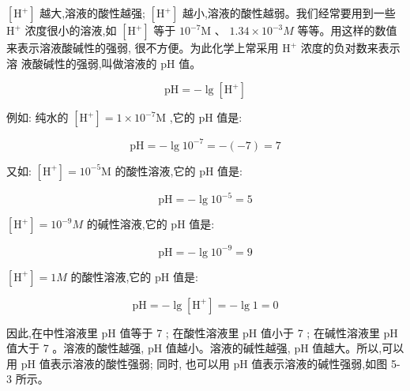 \documentclass[10pt]{article}
\begin{document}
\(\left\lbrack {\mathrm{H}}^{ + }\right\rbrack\) 越大,溶液的酸性越强; \(\left\lbrack {\mathrm{H}}^{ + }\right\rbrack\) 越小,溶液的酸性越弱。我们经常要用到一些 \({\mathrm{H}}^{ + }\) 浓度很小的溶液,如 \(\left\lbrack {\mathrm{H}}^{ + }\right\rbrack\) 等于 \({10}^{-7}\mathrm{M}\) 、 \({1.34} \times {10}^{-3}M\) 等等。用这样的数值来表示溶液酸碱性的强弱, 很不方便。为此化学上常采用 \({\mathrm{H}}^{ + }\) 浓度的负对数来表示溶 液酸碱性的强弱,叫做溶液的 \(\mathrm{{pH}}\) 值。

\[
\mathrm{{pH}} = - \lg \left\lbrack {\mathrm{H}}^{ + }\right\rbrack
\]

例如: 纯水的 \(\left\lbrack {\mathrm{H}}^{ + }\right\rbrack = 1 \times {10}^{-7}\mathrm{M}\) ,它的 \(\mathrm{{pH}}\) 值是:

\[
\mathrm{{pH}} = - \lg {10}^{-7} = - \left( {-7}\right) = 7
\]

又如: \(\left\lbrack {\mathrm{H}}^{ + }\right\rbrack = {10}^{-5}\mathrm{M}\) 的酸性溶液,它的 \(\mathrm{{pH}}\) 值是:

\[
\mathrm{{pH}} = - \lg {10}^{-5} = 5
\]

\(\left\lbrack {\mathrm{H}}^{ + }\right\rbrack = {10}^{-9}M\) 的碱性溶液,它的 \(\mathrm{{pH}}\) 值是:

\[
\mathrm{{pH}} = - \lg {10}^{-9} = 9
\]

\(\left\lbrack {\mathrm{H}}^{ + }\right\rbrack = {1M}\) 的酸性溶液,它的 \(\mathrm{{pH}}\) 值是:

\[
\mathrm{{pH}} = - \lg \left\lbrack {\mathrm{H}}^{ + }\right\rbrack = - \lg 1 = 0
\]

因此,在中性溶液里 \(\mathrm{{pH}}\) 值等于 7 ; 在酸性溶液里 \(\mathrm{{pH}}\) 值小于 7 ; 在碱性溶液里 \(\mathrm{{pH}}\) 值大于 7 。溶液的酸性越强, \(\mathrm{{pH}}\) 值越小。溶液的碱性越强, \(\mathrm{{pH}}\) 值越大。所以,可以用 \(\mathrm{{pH}}\) 值表示溶液的酸性强弱; 同时, 也可以用 \(\mathrm{{pH}}\) 值表示溶液的碱性强弱,如图 5-3 所示。
\end{document}
